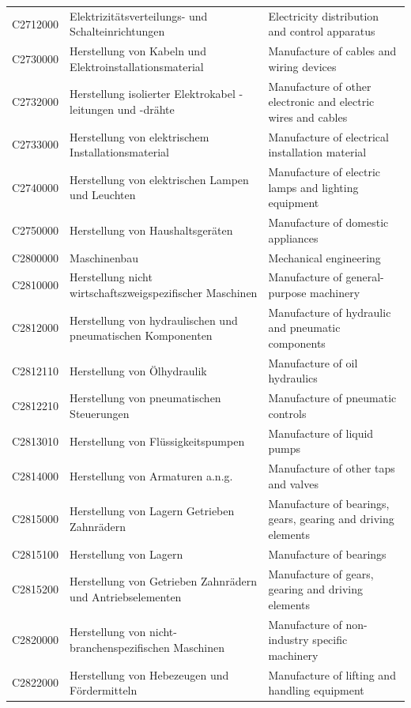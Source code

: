 \begin{longtable}{|p{3cm}|p{6cm}|p{6cm}|}
 C2712000   & Elektrizitätsverteilungs- und Schalteinrichtungen   & Electricity distribution and control apparatus    \\
 C2730000   & Herstellung von Kabeln und Elektroinstallationsmaterial   & Manufacture of cables and wiring devices    \\
 C2732000   & Herstellung isolierter Elektrokabel -leitungen und -drähte   & Manufacture of other electronic and electric wires and cables    \\
 C2733000   & Herstellung von elektrischem Installationsmaterial   & Manufacture of electrical installation material    \\
 C2740000   & Herstellung von elektrischen Lampen und Leuchten   & Manufacture of electric lamps and lighting equipment    \\
 C2750000   & Herstellung von Haushaltsgeräten   & Manufacture of domestic appliances    \\
 C2800000   & Maschinenbau   & Mechanical engineering    \\
 C2810000   & Herstellung nicht wirtschaftszweigspezifischer Maschinen   & Manufacture of general-purpose machinery    \\
 C2812000   & Herstellung von hydraulischen und pneumatischen Komponenten   & Manufacture of hydraulic and pneumatic components    \\
 C2812110   & Herstellung von Ölhydraulik   & Manufacture of oil hydraulics    \\
 C2812210   & Herstellung von pneumatischen Steuerungen   & Manufacture of pneumatic controls    \\
 C2813010   & Herstellung von Flüssigkeitspumpen   & Manufacture of liquid pumps    \\
 C2814000   & Herstellung von Armaturen a.n.g.   & Manufacture of other taps and valves    \\
 C2815000   & Herstellung von Lagern Getrieben Zahnrädern   & Manufacture of bearings, gears, gearing and driving elements    \\
 C2815100   & Herstellung von Lagern   & Manufacture of bearings    \\
 C2815200   & Herstellung von Getrieben Zahnrädern und Antriebselementen   & Manufacture of gears, gearing and driving elements    \\
 C2820000   & Herstellung von nicht-branchenspezifischen Maschinen   & Manufacture of non-industry specific machinery    \\
 C2822000   & Herstellung von Hebezeugen und Fördermitteln   & Manufacture of lifting and handling equipment    \\

\end{longtable}
